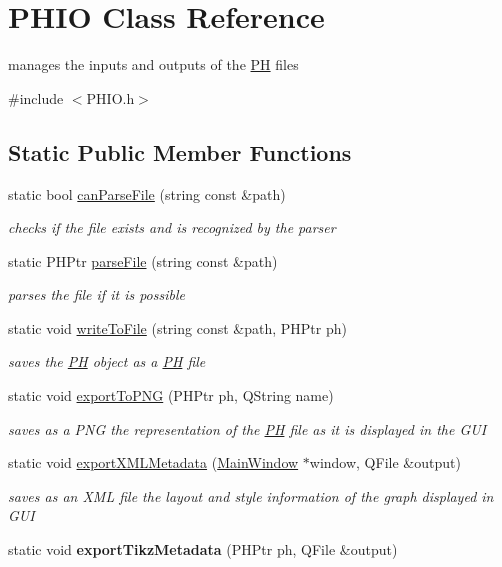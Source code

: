 \hypertarget{classPHIO}{\section{P\+H\+I\+O Class Reference}
\label{classPHIO}
}


manages the inputs and outputs of the \hyperlink{classPH}{P\+H} files  




{\ttfamily \#include $<$P\+H\+I\+O.\+h$>$}

\subsection*{Static Public Member Functions}
\begin{DoxyCompactItemize}
\item 
static bool \hyperlink{classPHIO_a6731852d98b581cce2a5df0984b21c07}{can\+Parse\+File} (string const \&path)
\begin{DoxyCompactList}\small\item\em checks if the file exists and is recognized by the parser \end{DoxyCompactList}\item 
static P\+H\+Ptr \hyperlink{classPHIO_a392414cadc400154232f5488fba80600}{parse\+File} (string const \&path)
\begin{DoxyCompactList}\small\item\em parses the file if it is possible \end{DoxyCompactList}\item 
static void \hyperlink{classPHIO_a383e5813d751f88a2c945d817a9204fd}{write\+To\+File} (string const \&path, P\+H\+Ptr ph)
\begin{DoxyCompactList}\small\item\em saves the \hyperlink{classPH}{P\+H} object as a \hyperlink{classPH}{P\+H} file \end{DoxyCompactList}\item 
static void \hyperlink{classPHIO_a815bbd9b063aaf8e11cd2869c950f1b4}{export\+To\+P\+N\+G} (P\+H\+Ptr ph, Q\+String name)
\begin{DoxyCompactList}\small\item\em saves as a P\+N\+G the representation of the \hyperlink{classPH}{P\+H} file as it is displayed in the G\+U\+I \end{DoxyCompactList}\item 
static void \hyperlink{classPHIO_acadc8f6f5a3595b41a05930dc810d26d}{export\+X\+M\+L\+Metadata} (\hyperlink{classMainWindow}{Main\+Window} $\ast$window, Q\+File \&output)
\begin{DoxyCompactList}\small\item\em saves as an X\+M\+L file the layout and style information of the graph displayed in G\+U\+I \end{DoxyCompactList}\item 
\hypertarget{classPHIO_a4847e266c56c53e9247c72e6dc7ac3c6}{static void {\bfseries export\+Tikz\+Metadata} (P\+H\+Ptr ph, Q\+File \&output)}\label{classPHIO_a4847e266c56c53e9247c72e6dc7ac3c6}

\end{DoxyCompactItemize}


